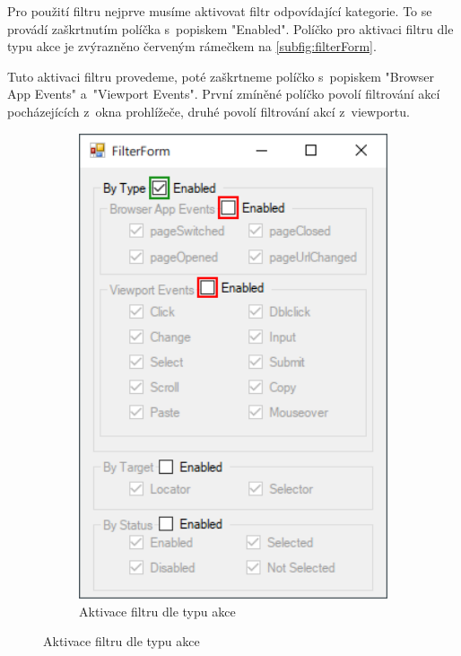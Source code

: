 \documentclass[12pt, a4paper, twoside]{article}
\begin{document}
	Pro použití filtru nejprve musíme aktivovat filtr odpovídající kategorie. To se provádí zaškrtnutím políčka s~popiskem "Enabled". Políčko pro aktivaci filtru dle typu akce je zvýrazněno červeným rámečkem na \cref{subfig:filterForm}.
	
	Tuto aktivaci filtru provedeme, poté zaškrtneme políčko s~popiskem "Browser App Events" a~"Viewport Events". První zmíněné políčko povolí filtrování akcí pocházejících z~okna prohlížeče, druhé povolí filtrování akcí z~viewportu. 
	\begin{figure}[H]
		\centering
		\begin{minipage}{0.47\textwidth}
			\begin{subfigure}[t]{1.0\textwidth}
				\includegraphics[width=1.0\textwidth]{filterForm2.png}
				\caption{Aktivace filtru dle typu akce}

\end{subfigure}
\end{minipage}
\end{figure}
\end{document}

